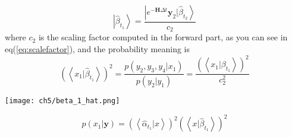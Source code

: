 \begin{definition}
        \begin{equation}
                \left|\hat{\beta}_{t_1}  \right> =  \frac{\left| e^{-\textbf{H}\Delta t} \textbf{y}_2 |\hat{\beta}_{t_2} \right>}{c_2}
        \end{equation}
        where $c_2$ is the scaling factor computed in the forward part, as you can see in eq(\ref{eq:scalefactor}), and 
        the probability meaning is
        \begin{equation}
                \left(\left<x_1|\hat{\beta}_{t_1} \right>\right)^2 = \frac{p(y_2, y_3, y_4|x_1)}{p(y_2|y_1)} 
                =  \frac{ (\left<x_1|\beta_{t_1} \right>)^2 }{ c_2^2 }
        \end{equation}
        \begin{center}
                \texttt{[image: ch5/beta\_1\_hat.png]}
        \end{center}
        \begin{equation}
                p(x_1|\textbf{y}) = (\left<\hat{\alpha}_{t_{1}}|x \right>)^2 \left(\left<x|\hat{\beta}_{t_{1}} \right>\right)^2
        \end{equation} 
\end{definition}